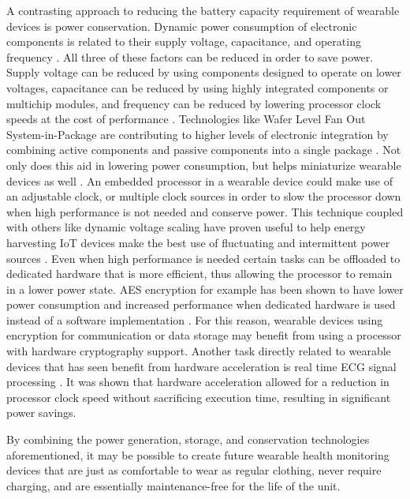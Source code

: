 A contrasting approach to reducing the battery capacity requirement of wearable 
devices is power conservation.  Dynamic power consumption of electronic 
components is related to their supply voltage, capacitance, and operating 
frequency \cite{Forman1994}. All three of these factors can be reduced in order 
to save power.  Supply voltage can be reduced by using components designed to 
operate on lower voltages, capacitance can be reduced by using highly integrated 
components or multichip modules, and frequency can be reduced by lowering 
processor clock speeds at the cost of performance \cite{Forman1994}.  
Technologies like Wafer Level Fan Out System-in-Package are contributing to 
higher levels of electronic integration by combining active components and 
passive components into a single package \cite{Martins2018}. Not only does this 
aid in lowering power consumption, but helps miniaturize wearable devices as 
well \cite{Martins2018}.
An embedded processor in a wearable device could make 
use of an adjustable clock, or multiple clock sources in order to slow the 
processor down when high performance is not needed and conserve power.  This 
technique coupled with others like dynamic voltage scaling have proven 
useful to help energy harvesting IoT devices make the best use of fluctuating
and intermittent power sources \cite{Ma2017}.
Even when high performance is needed certain tasks can be offloaded to dedicated
hardware that is more efficient, thus allowing the processor to remain in a 
lower power state.  AES encryption for example has been shown to have lower 
power consumption and increased performance when dedicated hardware is used
instead of a software implementation \cite{Hamalainen2006}.  For this reason,
wearable devices using encryption for communication or data storage may 
benefit from using a processor with hardware cryptography support. Another task
directly related to wearable devices that has seen benefit from hardware 
acceleration is real time ECG signal processing \cite{Cardarilli2018}. It was 
shown that hardware acceleration allowed for a reduction in processor clock 
speed without sacrificing execution time, resulting in significant power 
savings.

By combining the power generation, storage, and conservation technologies 
aforementioned, it may be possible to create future wearable health monitoring 
devices that are just as comfortable to wear as regular clothing, never 
require charging, and are essentially maintenance-free for the life of the unit.

